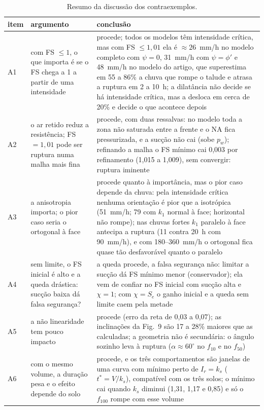\begin{table}[h!]
\centering\small
\caption{Resumo da discuss\~ao dos contraexemplos.}\label{tab:disc_resumo}
\begin{tabular}{p{0.7cm}p{4.3cm}p{9.8cm}}
\toprule
item & argumento & conclus\~ao\\
\midrule
A1 & com FS $\le1$, o que importa \'e se o FS chega a 1 a partir de uma intensidade &
procede; todos os modelos t\^em intensidade cr\'itica, mas com FS $\le1{,}01$ ela \'e $\approx26$~mm/h no modelo completo
com $\psi=0$, 31~mm/h com $\psi=\phi'$ e 48~mm/h no modelo do artigo, que superestima em 55 a 86\% a chuva que rompe o
talude e atrasa a ruptura em 2 a 10~h; a dilat\^ancia n\~ao decide se h\'a intensidade cr\'itica, mas a desloca em cerca
de 20\% e decide o que acontece depois\\
A2 & o ar retido reduz a resist\^encia; FS $=1{,}01$ pode ser ruptura numa malha mais fina &
procede, com duas ressalvas: no modelo toda a zona n\~ao saturada entre a frente e o NA fica pressurizada, e a
suc\c{c}\~ao n\~ao cai (sobe $p_w$); refinando a malha o FS m\'inimo cai 0,003 por refinamento (1,015 a 1,009), sem
convergir: ruptura iminente\\
A3 & a anisotropia importa; o pior caso seria o ortogonal \`a face &
procede quanto \`a import\^ancia, mas o pior caso depende da chuva: pela intensidade cr\'itica nenhuma orienta\c{c}\~ao
\'e pior que a isotr\'opica (51~mm/h; 79 com $k_1$ normal \`a face; horizontal n\~ao rompe); nas chuvas fortes $k_1$
paralelo \`a face antecipa a ruptura (11 contra 20~h com 90~mm/h), e com 180--360~mm/h o ortogonal fica quase t\~ao
desfavor\'avel quanto o paralelo\\
A4 & sem limite, o FS inicial \'e alto e a queda dr\'astica: suc\c{c}\~ao baixa d\'a falsa seguran\c{c}a? &
a queda procede, a falsa seguran\c{c}a n\~ao: limitar a suc\c{c}\~ao d\'a FS m\'inimo menor (conservador); ela vem de confiar
no FS inicial com suc\c{c}\~ao alta e $\chi=1$; com $\chi=S_e$ o ganho inicial e a queda sem limite caem pela metade\\
A5 & a n\~ao linearidade tem pouco impacto &
procede (erro da reta de 0,03 a 0,07); as inclina\c{c}\~oes da Fig.~9 s\~ao 17 a 28\% maiores que as calculadas; a
geometria n\~ao \'e secund\'aria: o \^angulo sozinho leva \`a ruptura ($\alpha\approx60^\circ$ no $f_{10}$ e no
$f_{50}$)\\
A6 & com o mesmo volume, a dura\c{c}\~ao pesa e o efeito depende do solo &
procede, e os tr\^es comportamentos s\~ao janelas de uma curva com m\'inimo perto de $I_r=k_s$ ($t^*=V/k_s$), compat\'ivel
com os tr\^es solos; o m\'inimo cai quando $k_s$ diminui (1,31, 1,17 e 0,85) e s\'o o $f_{100}$ rompe com esse volume\\
\bottomrule
\end{tabular}
\end{table}

